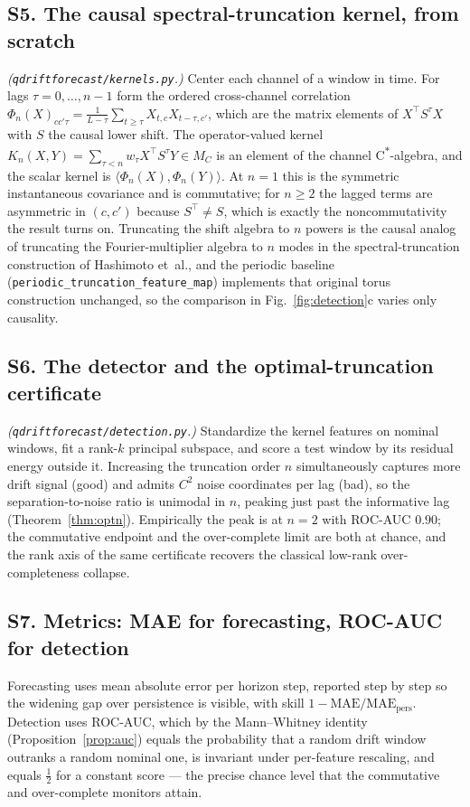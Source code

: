 \documentclass[
  aps,
  prresearch,
  reprint,
  amsmath,
  amssymb,
  nofootinbib,
  floatfix,
]{revtex4-2}
\begin{document}
\subsection*{S5. The causal spectral-truncation kernel, from scratch}
\emph{(\texttt{qdriftforecast/kernels.py}.)} Center each channel of a window in time.
For lags $\tau=0,\dots,n-1$ form the ordered cross-channel correlation
$\Phi_n(X)_{cc'\tau}=\frac{1}{L-\tau}\sum_{t\ge\tau}X_{t,c}X_{t-\tau,c'}$, which are
the matrix elements of $X^{\top}S^{\tau}X$ with $S$ the causal lower shift. The
operator-valued kernel $K_n(X,Y)=\sum_{\tau<n}w_\tau X^{\top}S^{\tau}Y\in M_C$ is an
element of the channel C\textsuperscript{$\ast$}-algebra, and the scalar kernel is
$\langle\Phi_n(X),\Phi_n(Y)\rangle$. At $n{=}1$ this is the symmetric instantaneous
covariance and is commutative; for $n\ge2$ the lagged terms are asymmetric in
$(c,c')$ because $S^{\top}\neq S$, which is exactly the noncommutativity the result
turns on. Truncating the shift algebra to $n$ powers is the causal analog of
truncating the Fourier-multiplier algebra to $n$ modes in the spectral-truncation
construction of Hashimoto et~al., and the periodic baseline
(\texttt{periodic\_truncation\_feature\_map}) implements that original torus
construction unchanged, so the comparison in Fig.~\ref{fig:detection}c varies only
causality.

\subsection*{S6. The detector and the optimal-truncation certificate}
\emph{(\texttt{qdriftforecast/detection.py}.)} Standardize the kernel features on
nominal windows, fit a rank-$k$ principal subspace, and score a test window by its
residual energy outside it. Increasing the truncation order $n$ simultaneously
captures more drift signal (good) and admits $C^2$ noise coordinates per lag (bad),
so the separation-to-noise ratio is unimodal in $n$, peaking just past the
informative lag (Theorem~\ref{thm:optn}). Empirically the peak is at $n{=}2$ with
ROC-AUC $0.90$; the commutative endpoint and the over-complete limit are both at
chance, and the rank axis of the same certificate recovers the classical low-rank
over-completeness collapse.

\subsection*{S7. Metrics: MAE for forecasting, ROC-AUC for detection}
Forecasting uses mean absolute error per horizon step, reported step by step so the
widening gap over persistence is visible, with skill
$1-\mathrm{MAE}/\mathrm{MAE}_{\text{pers}}$. Detection uses ROC-AUC, which by the
Mann--Whitney identity (Proposition~\ref{prop:auc}) equals the probability that a
random drift window outranks a random nominal one, is invariant under per-feature
rescaling, and equals $\tfrac12$ for a constant score --- the precise chance level
that the commutative and over-complete monitors attain.
\end{document}
